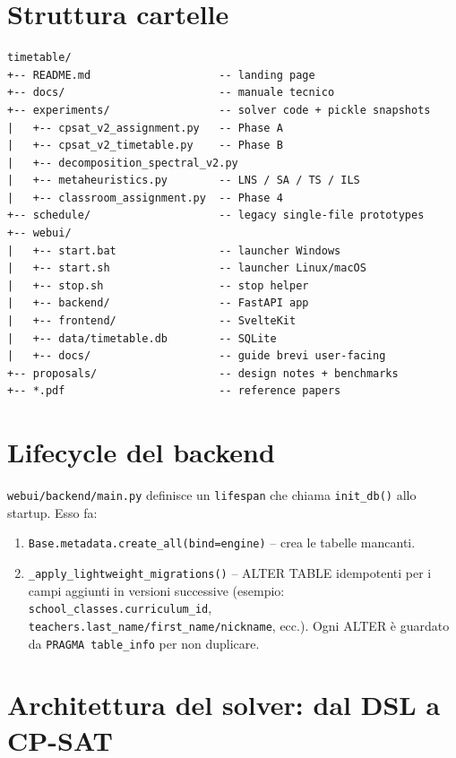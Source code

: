 \section{Struttura cartelle}

\begin{lstlisting}[style=shell]
timetable/
+-- README.md                    -- landing page
+-- docs/                        -- manuale tecnico
+-- experiments/                 -- solver code + pickle snapshots
|   +-- cpsat_v2_assignment.py   -- Phase A
|   +-- cpsat_v2_timetable.py    -- Phase B
|   +-- decomposition_spectral_v2.py
|   +-- metaheuristics.py        -- LNS / SA / TS / ILS
|   +-- classroom_assignment.py  -- Phase 4
+-- schedule/                    -- legacy single-file prototypes
+-- webui/
|   +-- start.bat                -- launcher Windows
|   +-- start.sh                 -- launcher Linux/macOS
|   +-- stop.sh                  -- stop helper
|   +-- backend/                 -- FastAPI app
|   +-- frontend/                -- SvelteKit
|   +-- data/timetable.db        -- SQLite
|   +-- docs/                    -- guide brevi user-facing
+-- proposals/                   -- design notes + benchmarks
+-- *.pdf                        -- reference papers
\end{lstlisting}

\section{Lifecycle del backend}

\texttt{webui/backend/main.py} definisce un \texttt{lifespan} che
chiama \texttt{init\_db()} allo startup. Esso fa:

\begin{enumerate}
  \item \texttt{Base.metadata.create\_all(bind=engine)} -- crea le
        tabelle mancanti.
  \item \texttt{\_apply\_lightweight\_migrations()} -- ALTER TABLE
        idempotenti per i campi aggiunti in versioni successive
        (esempio: \texttt{school\_classes.curriculum\_id},
        \texttt{teachers.last\_name/first\_name/nickname}, ecc.).
        Ogni ALTER \`e guardato da \texttt{PRAGMA table\_info} per non
        duplicare.
\end{enumerate}

\section{Architettura del solver: dal DSL a CP-SAT}
\label{sec:arch-dsl-cpsat}

